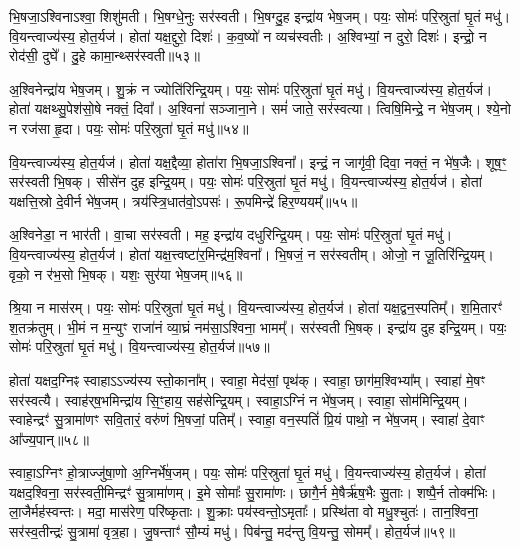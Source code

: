 भि॒षजा॒\-ऽश्विना\-ऽश्वा॒ शिशु॑मती।
भि॒षग्धे॒नुः सर॑स्वती।
भि॒षग्दु॒ह इन्द्रा॑य भेष॒जम्।
पयः॒ सोमः॑ परि॒स्रुता॑ घृ॒तं मधु॑।
वि॒यन्त्वाज्य॑स्य॒ होत॒र्यज॑।
होता॑ यक्ष॒द्दुरो॒ दिशः॑।
क॒व॒ष्यो॑ न व्यच॑स्वतीः।
अ॒श्विभ्यां॒ न दुरो॒ दिशः॑।
इन्द्रो॒ न रोद॑सी॒ दुघे᳚।
दु॒हे कामा॒न्थ्सर॑स्वती॥५३॥

अ॒श्विनेन्द्रा॑य भेष॒जम्।
शु॒क्रं न ज्योति॑रिन्द्रि॒यम्।
पयः॒ सोमः॑ परि॒स्रुता॑ घृ॒तं मधु॑।
वि॒यन्त्वाज्य॑स्य॒ होत॒र्यज॑।
होता॑ यक्षथ्सु॒पेश॑सो॒षे नक्तं॒ दिवा᳚।
अ॒श्विना॑ सञ्जाना॒ने।
समं॑ जाते॒ सर॑स्वत्या।
त्विषि॒मिन्द्रे॒ न भे॑ष॒जम्।
श्ये॒नो न रज॑सा हृ॒दा।
पयः॒ सोमः॑ परि॒स्रुता॑ घृ॒तं मधु॑॥५४॥

वि॒यन्त्वाज्य॑स्य॒ होत॒र्यज॑।
होता॑ यक्ष॒द्दैव्या॒ होता॑रा भि॒षजा॒\-ऽश्विना᳚।
इन्द्रं॒ न जागृ॑वी॒ दिवा॒ नक्तं॒ न भे॑ष॒जैः।
शूष॒ꣳ॒ सर॑स्वती भि॒षक्।
सीसे॑न दुह इन्द्रि॒यम्।
पयः॒ सोमः॑ परि॒स्रुता॑ घृ॒तं मधु॑।
वि॒यन्त्वाज्य॑स्य॒ होत॒र्यज॑।
होता॑ यक्षत्ति॒स्रो दे॒वीर्न भे॑ष॒जम्।
त्रय॑स्त्रि॒धात॑वो॒\-ऽपसः॑।
रू॒पमिन्द्रे॑ हिर॒ण्ययम्᳚॥५५॥

अ॒श्विनेडा॒ न भार॑ती।
वा॒चा सर॑स्वती।
मह॒ इन्द्रा॑य दधुरिन्द्रि॒यम्।
पयः॒ सोमः॑ परि॒स्रुता॑ घृ॒तं मधु॑।
वि॒यन्त्वाज्य॑स्य॒ होत॒र्यज॑।
होता॑ यक्ष॒त्त्वष्टा॑र॒मिन्द्र॑म॒श्विना᳚।
भि॒षजं॒ न सर॑स्वतीम्।
ओजो॒ न जू॒तिरि॑न्द्रि॒यम्।
वृको॒ न र॑भ॒सो भि॒षक्।
यशः॒ सुर॑या भेष॒जम्॥५६॥

श्रि॒या न मास॑रम्।
पयः॒ सोमः॑ परि॒स्रुता॑ घृ॒तं मधु॑।
वि॒यन्त्वाज्य॑स्य॒ होत॒र्यज॑।
होता॑ यक्ष॒द्वन॒स्पतिम्᳚।
श॒मि॒तारꣳ॑ श॒तक्र॑तुम्।
भी॒मं न म॒न्युꣳ राजा॑नं व्या॒घ्रं नम॑सा॒\-ऽश्विना॒ भामम्᳚।
सर॑स्वती भि॒षक्।
इन्द्रा॑य दुह इन्द्रि॒यम्।
पयः॒ सोमः॑ परि॒स्रुता॑ घृ॒तं मधु॑।
वि॒यन्त्वाज्य॑स्य॒ होत॒र्यज॑॥५७॥

होता॑ यक्षद॒ग्निꣴ स्वाहा\-ऽऽज्य॑स्य स्तो॒काना᳚म्।
स्वाहा॒ मेद॑सां॒ पृथ॑क्।
स्वाहा॒ छाग॑म॒श्विभ्या᳚म्।
स्वाहा॑ मे॒षꣳ सर॑स्वत्यै।
स्वाह॑र्‌\mbox{}ष॒भमिन्द्रा॑य सि॒ꣳ॒हाय॒ सह॑सेन्द्रि॒यम्।
स्वाहा॒\-ऽग्निं न भे॑ष॒जम्।
स्वाहा॒ सोम॑मिन्द्रि॒यम्।
स्वाहेन्द्रꣳ॑ सु॒त्रामा॑णꣳ सवि॒तारं॒ वरु॑णं भि॒षजां॒ पतिम्᳚।
स्वाहा॒ वन॒स्पतिं॑ प्रि॒यं पाथो॒ न भे॑ष॒जम्।
स्वाहा॑ दे॒वाꣳ आ᳚ज्य॒पान्॥५८॥

स्वाहा॒\-ऽग्निꣳ हो॒त्राज्जु॑षा॒णो अ॒ग्निर्भे॑ष॒जम्।
पयः॒ सोमः॑ परि॒स्रुता॑ घृ॒तं मधु॑।
वि॒यन्त्वाज्य॑स्य॒ होत॒र्यज॑।
होता॑ यक्षद॒श्विना॒ सर॑स्वती॒मिन्द्रꣳ॑ सु॒त्रामा॑णम्।
इ॒मे सोमाः᳚ सु॒रामा॑णः।
छागै॒र्न मे॒षैर्\mbox{}ऋ॑ष॒भैः सु॒ताः।
शष्पै॒र्न तोक्म॑भिः।
ला॒जैर्मह॑स्वन्तः।
मदा॒ मास॑रेण॒ परि॑ष्कृताः।
शु॒क्राः पय॑स्वन्तो॒\-ऽमृताः᳚।
प्रस्थि॑ता वो मधु॒श्चुतः॑।
तान॒श्विना॒ सर॑स्व॒तीन्द्रः॑ सु॒त्रामा॑ वृत्र॒हा।
जु॒षन्ताꣳ॑ सौ॒म्यं मधु॑।
पिब॑न्तु॒ मद॑न्तु वि॒यन्तु॒ सोमम्᳚।
होत॒र्यज॑॥५९॥


